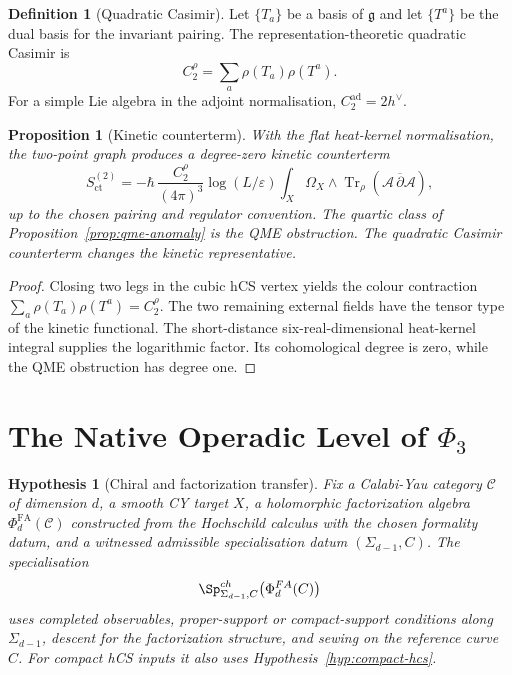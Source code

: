 \documentclass[11pt]{amsart}
\newtheorem{proposition}[theorem]{Proposition}
\newtheorem{hypothesis}[theorem]{Hypothesis}
\theoremstyle{definition}
\newtheorem{definition}[theorem]{Definition}
\theoremstyle{remark}
\providecommand{\cA}{\mathcal A}
\providecommand{\cC}{\mathcal C}
\providecommand{\dbar}{\overline{\partial}}
\providecommand{\fg}{\mathfrak g}
\begin{document}
\begin{definition}[Quadratic Casimir]
\label{def:quadratic-casimir}
Let $\{T_a\}$ be a basis of $\fg$ and let $\{T^a\}$ be the dual basis
for the invariant pairing. The representation-theoretic quadratic
Casimir is
\[
  C_2^\rho=\sum_a\rho(T_a)\rho(T^a).
\]
For a simple Lie algebra in the adjoint normalisation,
$C_2^{\mathrm{ad}}=2h^\vee$.
\end{definition}

\begin{proposition}[Kinetic counterterm]
\label{prop:kinetic-counterterm}
With the flat heat-kernel normalisation, the two-point graph produces
a degree-zero kinetic counterterm
\[
  S_{\mathrm{ct}}^{(2)}
  =
  -\hbar\,\frac{C_2^\rho}{(4\pi)^3}
  \log(L/\varepsilon)
  \int_X\Omega_X\wedge\operatorname{Tr}_\rho(\cA\,\dbar\cA),
\]
up to the chosen pairing and regulator convention. The quartic class of
Proposition~\ref{prop:qme-anomaly} is the QME obstruction. The
quadratic Casimir counterterm changes the kinetic representative.
\end{proposition}

\begin{proof}
Closing two legs in the cubic hCS vertex yields the colour contraction
$\sum_a\rho(T_a)\rho(T^a)=C_2^\rho$. The two remaining external fields
have the tensor type of the kinetic functional. The short-distance
six-real-dimensional heat-kernel integral supplies the logarithmic
factor. Its cohomological degree is zero, while the QME obstruction has
degree one.
\end{proof}

\section{The Native Operadic Level of \texorpdfstring{$\Phi_3$}{Phi3}}
\label{sec:phi3-level}

\begin{hypothesis}[Chiral and factorization transfer]
\label{hyp:chiral-transfer}
Fix a Calabi-Yau category $\cC$ of dimension $d$, a smooth CY target
$X$, a holomorphic factorization algebra $\Phi^{\mathrm{FA}}_d(\cC)$
constructed from the Hochschild calculus with the chosen formality
datum, and a witnessed admissible specialisation datum
$(\Sigma_{d-1},C)$. The specialisation
\[
  \Sp^{\mathrm{ch}}_{\Sigma_{d-1},C}
  \bigl(\Phi^{\mathrm{FA}}_d(\cC)\bigr)
\]
uses completed observables, proper-support or compact-support
conditions along $\Sigma_{d-1}$, descent for the factorization
structure, and sewing on the reference curve $C$. For compact hCS
inputs it also uses Hypothesis~\ref{hyp:compact-hcs}.
\end{hypothesis}
\end{document}
